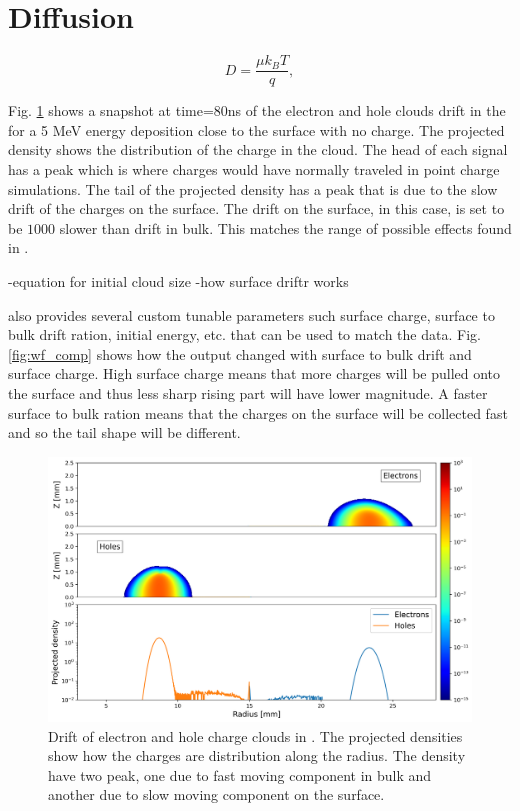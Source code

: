 \section{Diffusion}
\begin{equation}
    D = \frac{\mu k_B T}{q} ,
\end{equation}

Fig. \ref{ch3:fig:ehd_path_pd_sc0} shows a snapshot at time=$80$ns of the electron and hole clouds drift in the {\tdsim} for a 5 MeV energy deposition close to the surface with no charge. The projected density shows the distribution of the charge in the cloud. The head of each signal has a peak which is where charges would have normally traveled in point charge simulations. The tail of the projected density has a peak that is due to the slow drift of the charges on the surface. The drift on the surface, in this case, is set to be $1000$ slower than drift in bulk. This matches the range of possible effects found in \cite{MULLOWNEY201233}. 

-equation for initial cloud size
-how surface driftr works

{\tdsim} also provides several custom tunable parameters such surface charge, surface to bulk drift ration, initial energy, etc. that can be used to match the data. Fig. \ref{fig:wf_comp} shows how the output changed with surface to bulk drift and surface charge. High surface charge means that more charges will be pulled onto the surface and thus less sharp rising part will have lower magnitude. A faster surface to bulk ration means that the charges on the surface will be collected fast and so the tail shape will be different.

\begin{figure}
    \includegraphics[trim={0cm 0 0cm 0},clip,width=0.99\linewidth]{ch3/figs/drift_path_sc=0.0.png}
    \caption{Drift of electron and hole charge clouds in {\tdsim}. The projected densities show how the charges are distribution along the radius. The density have two peak, one due to fast moving component in bulk and another due to slow moving component on the surface.}
    \label{ch3:fig:ehd_path_pd_sc0}
\end{figure}


